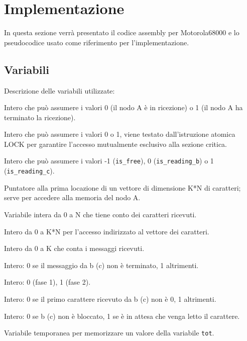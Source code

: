 \documentclass{article}
\begin{document}

\section{Implementazione}
In questa sezione verrà presentato il codice assembly per Motorola68000 e lo pseudocodice usato come riferimento per l'implementazione.

\subsection{Variabili}
Descrizione delle variabili utilizzate: 
\\

\begin{description}[style=nextline,leftmargin=3.45cm,labelwidth=2.8cm,labelsep=0.6cm,font=\ttfamily\bfseries]
  \item[fine] Intero che può assumere i valori 0 (il nodo A è in ricezione) o 1 (il nodo A ha terminato la ricezione).
  \item[lock] Intero che può assumere i valori 0 o 1, viene testato dall'istruzione atomica LOCK per garantire l'accesso mutualmente esclusivo alla sezione critica.
  \item[possesso] Intero che può assumere i valori -1 (\texttt{is\_free}), 0 (\texttt{is\_reading\_b}) o 1 (\texttt{is\_reading\_c}).
  \item[buff] Puntatore alla prima locazione di un vettore di dimensione K*N di caratteri; serve per accedere alla memoria del nodo A.
  \item[curr] Variabile intera da 0 a N che tiene conto dei caratteri ricevuti.
  \item[tot] Intero da 0 a K*N per l’accesso indirizzato al vettore dei caratteri.
  \item[msg] Intero da 0 a K che conta i messaggi ricevuti.
  \item[end\_b,(end\_c)] Intero: 0 se il messaggio da b (c) non è terminato, 1 altrimenti.
  \item[fase2] Intero: 0 (fase 1), 1 (fase 2).
  \item[cond\_b,(cond\_c)] Intero: 0 se il primo carattere ricevuto da b (c) non è 0, 1 altrimenti.
  \item[b\_sus,(c\_sus)] Intero: 0 se b (c) non è bloccato, 1 se è in attesa che venga letto il carattere.
  \item[idx] Variabile temporanea per memorizzare un valore della variabile \texttt{tot}.
\end{description}
\end{document}
